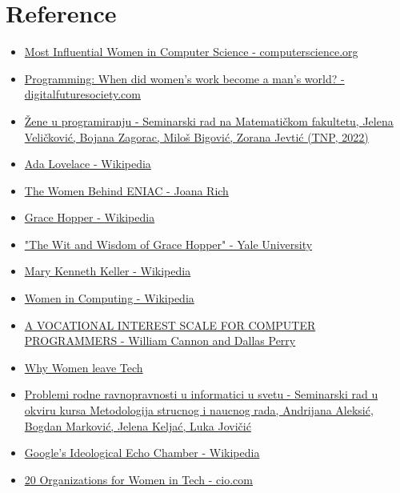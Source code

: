 \documentclass[12pt]{article}
\begin{document}
\section*{Reference}
\begin{itemize}
  \item \href{https://www.computerscience.org/resources/most-influential-women-computer-science}{Most Influential Women in Computer Science - computerscience.org}  
  \item \href{https://digitalfuturesociety.com/programming-when-did-womens-work-become-a-mans-world/}{Programming: When did women's work become a man's world? - digitalfuturesociety.com} 
  \item  \href{https://poincare.matf.bg.ac.rs/~ivana/tnp2022/reviews/18_VelickovicZagoracBigovicJevtic_review.pdf}{Žene u programiranju - Seminarski rad na Matematičkom fakultetu, Jelena Veličković, Bojana Zagorac, Miloš Bigović, Zorana Jevtić (TNP, 2022)}
  \item  \href{https://en.wikipedia.org/wiki/Ada_Lovelace#First_published_computer_program}{Ada Lovelace - Wikipedia}
  \item  \href{https://spectrum.ieee.org/the-women-behind-eniac}{The Women Behind ENIAC - Joana Rich}
  \item  \href{https://en.wikipedia.org/wiki/Grace_Hopper#World_War_II}{Grace Hopper - Wikipedia}
  \item  \href{https://www.cs.yale.edu/homes/tap/Files/hopper-wit.html}{"The Wit and Wisdom of Grace Hopper" - Yale University}
  \item  \href{https://en.wikipedia.org/wiki/Mary_Kenneth_Keller}{Mary Kenneth Keller - Wikipedia}
  \item  \href{https://en.wikipedia.org/wiki/Women_in_computing}{Women in Computing - Wikipedia}
  \item  \href{https://dl.acm.org/doi/pdf/10.1145/1142620.1142628}{A VOCATIONAL INTEREST SCALE FOR
COMPUTER PROGRAMMERS - William Cannon and Dallas Perry}
  \item  \href{https://www.womenintech.co.uk/6-reasons-why-so-many-women-leave-tech-jobs/#:~:text=A%20staggering%2056%25%20of%20women,this%20percentage%20will%20only%20decrease.}{Why Women leave Tech}
  \item  \href{http://ns2.matf.bg.ac.rs/~milena/msnr/2022/finalne_verzije/03_ProblemiRodneRavnopravnostiUInformaticiUSvetu_AleksicMarkovicKeljacJovicic.pdf}{Problemi rodne ravnopravnosti u informatici u svetu - Seminarski rad u okviru kursa Metodologija strucnog i naucnog rada, Andrijana Aleksić, Bogdan Marković, Jelena Keljać, Luka Jovičić}
  
  \item
  \href{https://en.wikipedia.org/wiki/Google%27s_Ideological_Echo_Chamber#Cultural_commentary}{Google's Ideological Echo Chamber - Wikipedia}
  \item
  \href{https://www.cio.com/article/215709/16-organizations-for-women-in-tech.html}{20 Organizations for Women in Tech - cio.com}
\end{itemize}
\end{document}
